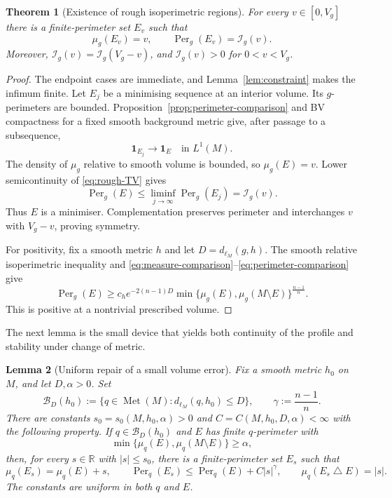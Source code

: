 \documentclass[11pt]{amsart}
\newtheorem{theorem}{Theorem}[section]
\newtheorem{lemma}[theorem]{Lemma}
\theoremstyle{definition}
\theoremstyle{remark}
\newcommand{\Met}{\operatorname{Met}}
\newcommand{\dMet}{d_{\ell_M}}
\newcommand{\Per}{\operatorname{Per}}
\newcommand{\one}{\mathbf 1}
\newcommand{\R}{\mathbb R}
\newcommand{\cI}{\mathcal I}
\begin{document}
\begin{theorem}[Existence of rough isoperimetric regions]
\label{thm:existence}
For every $v\in[0,V_g]$ there is a finite-perimeter set $E_v$ such that
\[
 \mu_g(E_v)=v,
 \qquad
 \Per_g(E_v)=\cI_g(v).
\]
Moreover, $\cI_g(v)=\cI_g(V_g-v)$, and $\cI_g(v)>0$ for
$0<v<V_g$.
\end{theorem}

\begin{proof}
The endpoint cases are immediate, and Lemma~\ref{lem:constraint} makes the
infimum finite.  Let $E_j$ be a minimising sequence at an interior volume.
Its $g$-perimeters are bounded.  Proposition~\ref{prop:perimeter-comparison}
and BV compactness for a fixed smooth background metric give, after passage
to a subsequence,
\[
 \one_{E_j}\longrightarrow\one_E\quad\text{in }L^1(M).
\]
The density of $\mu_g$ relative to smooth volume is bounded, so
$\mu_g(E)=v$.  Lower semicontinuity of \eqref{eq:rough-TV} gives
\[
 \Per_g(E)\leq\liminf_{j\to\infty}\Per_g(E_j)=\cI_g(v).
\]
Thus $E$ is a minimiser.  Complementation preserves perimeter and interchanges
$v$ with $V_g-v$, proving symmetry.

For positivity, fix a smooth metric $h$ and let
$D=\dMet(g,h)$.  The smooth relative isoperimetric inequality and
\eqref{eq:measure-comparison}--\eqref{eq:perimeter-comparison} give
\begin{equation}\label{eq:rough-relative-iso}
 \Per_g(E)\geq c_h e^{-2(n-1)D}
 \min\{\mu_g(E),\mu_g(M\setminus E)\}^{\frac{n-1}{n}}.
\end{equation}
This is positive at a nontrivial prescribed volume.
\end{proof}

The next lemma is the small device that yields both continuity of the profile
and stability under change of metric.

\begin{lemma}[Uniform repair of a small volume error]
\label{lem:uniform-repair}
Fix a smooth metric $h_0$ on $M$, and let $D,\alpha>0$.  Set
\[
 \mathcal B_D(h_0):=\{q\in\Met(M):\dMet(q,h_0)\leq D\},
 \qquad \gamma:=\frac{n-1}{n}.
\]
There are constants $s_0=s_0(M,h_0,\alpha)>0$ and
$C=C(M,h_0,D,\alpha)<\infty$ with the following property.  If
$q\in\mathcal B_D(h_0)$ and $E$ has finite $q$-perimeter with
\[
 \min\{\mu_q(E),\mu_q(M\setminus E)\}\geq\alpha,
\]
then, for every $s\in\R$ with $|s|\leq s_0$, there is a finite-perimeter set
$E_s$ such that
\begin{equation}\label{eq:uniform-repair}
 \mu_q(E_s)=\mu_q(E)+s,
 \qquad
 \Per_q(E_s)\leq\Per_q(E)+C|s|^\gamma,
 \qquad
 \mu_q(E_s\mathbin\triangle E)=|s|.
\end{equation}
The constants are uniform in both $q$ and $E$.
\end{lemma}
\end{document}
